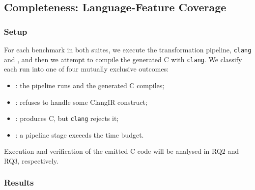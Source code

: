 

\subsection{Completeness: Language-Feature Coverage}\label{sec:eval-coverage}

\subsubsection{Setup}

For each benchmark in both suites, we execute the transformation pipeline, \ie \texttt{clang} and \toolcirc, and then we attempt to compile the generated C with \texttt{clang}. %
We classify each run into one of four mutually exclusive outcomes:

\begin{itemize}
  \item \textit{\ocPass}: the pipeline runs and the generated C compiles;
  \item \textit{\ocToolFail}: \toolcirc refuses to handle some ClangIR construct;
  \item \textit{\ocCompileFail}: \toolcirc produces C, but \texttt{clang} rejects it;
  \item \textit{\ocTimeout}: a pipeline stage exceeds the time budget.
\end{itemize}

Execution and verification of the emitted C code will be analysed in RQ2 and RQ3, respectively. %

\subsubsection{Results}

